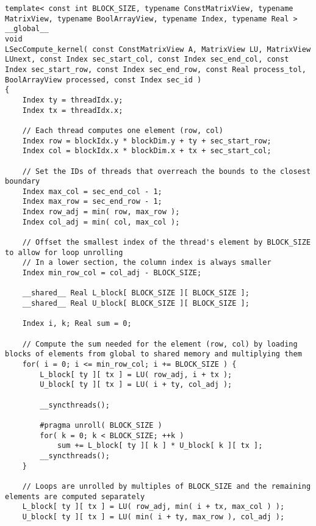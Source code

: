 \begin{lstlisting}[caption={Implementation of the \code{LSecCompute\_kernel()} kernel which computes one iteration of a lower section.
Note that the matrices, vectors, and arrays are passed using their views, and the scalar values are copied to the local memory of each thread.},label={Listing:ICMxPP-implementation->kernels->lower-section-compute}]
template< const int BLOCK_SIZE, typename ConstMatrixView, typename MatrixView, typename BoolArrayView, typename Index, typename Real >
__global__
void
LSecCompute_kernel( const ConstMatrixView A, MatrixView LU, MatrixView LUnext, const Index sec_start_col, const Index sec_end_col, const Index sec_start_row, const Index sec_end_row, const Real process_tol, BoolArrayView processed, const Index sec_id )
{
	Index ty = threadIdx.y;
	Index tx = threadIdx.x;
	
	// Each thread computes one element (row, col)
	Index row = blockIdx.y * blockDim.y + ty + sec_start_row;
	Index col = blockIdx.x * blockDim.x + tx + sec_start_col;
	
	// Set the IDs of threads that overreach the bounds to the closest boundary
	Index max_col = sec_end_col - 1;
	Index max_row = sec_end_row - 1;
	Index row_adj = min( row, max_row );
	Index col_adj = min( col, max_col );
	
	// Offset the smallest index of the thread's element by BLOCK_SIZE to allow for loop unrolling
	// In a lower section, the column index is always smaller
	Index min_row_col = col_adj - BLOCK_SIZE;
	
	__shared__ Real L_block[ BLOCK_SIZE ][ BLOCK_SIZE ];
	__shared__ Real U_block[ BLOCK_SIZE ][ BLOCK_SIZE ];
	
	Index i, k; Real sum = 0;
	
	// Compute the sum needed for the element (row, col) by loading blocks of elements from global to shared memory and multiplying them
	for( i = 0; i <= min_row_col; i += BLOCK_SIZE ) {
		L_block[ ty ][ tx ] = LU( row_adj, i + tx );
		U_block[ ty ][ tx ] = LU( i + ty, col_adj );
		
		__syncthreads();
		
		#pragma unroll( BLOCK_SIZE )
		for( k = 0; k < BLOCK_SIZE; ++k )
			sum += L_block[ ty ][ k ] * U_block[ k ][ tx ];
		__syncthreads();
	}
	
	// Loops are unrolled by multiples of BLOCK_SIZE and the remaining elements are computed separately
	L_block[ ty ][ tx ] = LU( row_adj, min( i + tx, max_col ) );
	U_block[ ty ][ tx ] = LU( min( i + ty, max_row ), col_adj );
	

\end{lstlisting}
